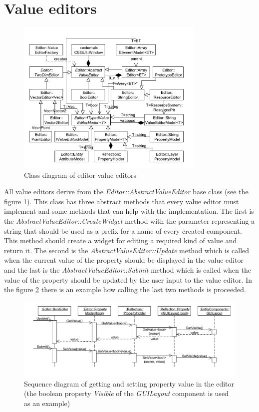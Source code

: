 \documentclass[a4paper, 12pt]{report}
\begin{document}
\section{Value editors}

\begin{figure}[htbp]
	\centering
		\includegraphics[width=0.8\textwidth]{EditorValueEditorsClassDiagram.pdf}
	\caption{Class diagram of editor value editors}
	\label{fig:editor-value-editors-diagram}
\end{figure}

All value editors derive from the \emph{Editor::AbstractValueEditor} base class (see the figure \ref{fig:editor-value-editors-diagram}). This class has three abstract methods that every value editor must implement and some methods that can help with the implementation. The first is the \emph{AbstractValueEditor::CreateWidget} method with the parameter representing a string that should be used as a prefix for a name of every created component. This method should create a widget for editing a required kind of value and return it. The second is the \emph{AbstractValueEditor::Update} method which is called when the current value of the property should be displayed in the value editor and the last is the \emph{AbstractValueEditor::Submit} method which is called when the value of the property should be updated by the user input to the value editor. In the figure \ref{fig:editor-value-sequence} there is an example how calling the last two methods is proceeded.

\begin{figure}[htbp]
	\centering
		\includegraphics[width=1\textwidth]{EditorValueSequence.pdf}
	\caption[Sequence diagram of getting and setting property value]{Sequence diagram of getting and setting property value in the editor (the boolean property \emph{Visible} of the \emph{GUILayout} component is used as an example)}
	\label{fig:editor-value-sequence}
\end{figure}
\end{document}

